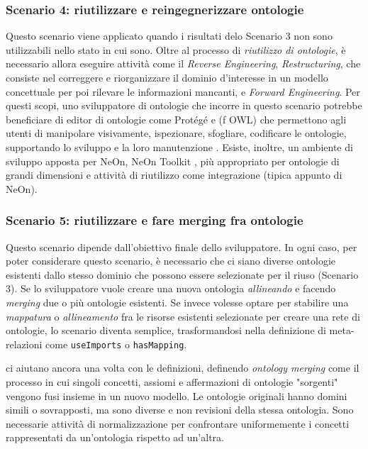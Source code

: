 \subsubsection*{Scenario 4: riutilizzare e reingegnerizzare ontologie}
Questo scenario viene applicato quando i risultati delo Scenario 3 non sono utilizzabili nello stato in cui sono. Oltre al processo di \textit{riutilizzo di ontologie}, è necessario allora eseguire attività come il \textit{Reverse Engineering}, \textit{Restructuring}, che consiste nel correggere e riorganizzare il dominio d'interesse in un modello concettuale per poi rilevare le informazioni mancanti, e \textit{Forward Engineering}. Per questi scopi, uno sviluppatore di ontologie che incorre in questo scenario potrebbe beneficiare di editor di ontologie come Prot\'eg\'e \cite{protege} e (f OWL) \cite{fOWL} che permettono agli utenti di manipolare visivamente, ispezionare, sfogliare, codificare le ontologie, supportando lo sviluppo e la loro manutenzione \cite{alatrish2013comparison}. Esiste, inoltre, un ambiente di sviluppo apposta per NeOn, NeOn Toolkit \cite{NeOnToolkit}, più appropriato per ontologie di grandi dimensioni e attività di riutilizzo come integrazione (tipica appunto di NeOn).

\subsubsection*{Scenario 5: riutilizzare e fare merging fra ontologie}
Questo scenario dipende dall'obiettivo finale dello sviluppatore. In ogni caso, per poter considerare questo scenario, è necessario che ci siano diverse ontologie esistenti dallo stesso dominio che possono essere selezionate per il riuso (Scenario 3). Se lo sviluppatore vuole creare una nuova ontologia \textit{allineando} e facendo \textit{merging} due o più ontologie esistenti. Se invece volesse optare per stabilire una \textit{mappatura} o \textit{allineamento} fra le risorse esistenti selezionate per creare una rete di ontologie, lo scenario diventa semplice, trasformandosi nella definizione di meta-relazioni come \texttt{useImports} o \texttt{hasMapping}.

\cite{choi2006Mapping, carriero2020OntoReuse} ci aiutano ancora una volta con le definizioni, definendo \textit{ontology merging} come il processo in cui singoli concetti, assiomi e affermazioni di ontologie "sorgenti" vengono fusi insieme in un nuovo modello. Le ontologie originali hanno domini simili o sovrapposti, ma sono diverse e non revisioni della stessa ontologia. Sono necessarie attività di normalizzazione per confrontare uniformemente i concetti rappresentati da un'ontologia rispetto ad un'altra.

